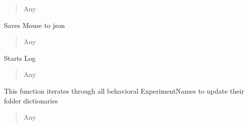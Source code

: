 \documentclass[letterpaper,10pt,english]{sphinxmanual}
\begin{document}
\begin{fulllineitems}
\begin{fulllineitems}
\begin{quote}
\begin{description}
\sphinxAtStartPar
Any

\end{description}\end{quote}

\end{fulllineitems}


\begin{fulllineitems}
\label{\detokenize{Organization:Organization.Mouse.save}}
\pysigstartsignatures
{}
\pysigstopsignatures
\sphinxAtStartPar
Saves Mouse to json
\begin{quote}\begin{description}
\sphinxAtStartPar
Any

\end{description}\end{quote}

\end{fulllineitems}


\begin{fulllineitems}
\label{\detokenize{Organization:Organization.Mouse.start_log}}
\pysigstartsignatures
{}
\pysigstopsignatures
\sphinxAtStartPar
Starts Log
\begin{quote}\begin{description}
\sphinxAtStartPar
Any

\end{description}\end{quote}

\end{fulllineitems}


\begin{fulllineitems}
\label{\detokenize{Organization:Organization.Mouse.update_all_folder_dictionaries}}
\pysigstartsignatures
{}
\pysigstopsignatures
\sphinxAtStartPar
This function iterates through all behavioral ExperimentNames to update their folder dictionaries
\begin{quote}\begin{description}
\sphinxAtStartPar
Any


\end{description}
\end{quote}
\end{fulllineitems}
\end{fulllineitems}
\end{document}
